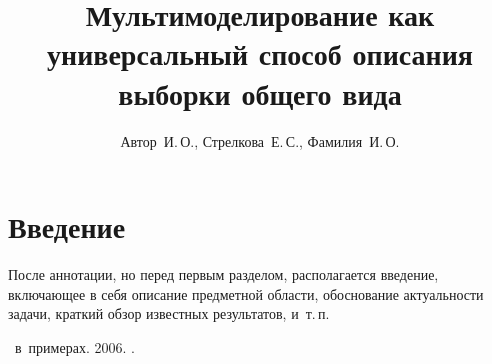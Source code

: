 \documentclass[12pt,twoside]{article}
\title
    [Мультимоделирование как универсальный способ описания выборки общего вида] %
    {Мультимоделирование как универсальный способ описания выборки общего вида}
\author
    [Автор~И.\,О.] %
    {Автор~И.\,О., Стрелкова~Е.\,С., Фамилия~И.\,О.} %
\begin{document}
\maketitle
\section{Введение}
После аннотации, но перед первым разделом,
располагается введение, включающее в себя
описание предметной области,
обоснование актуальности задачи,
краткий обзор известных результатов,
и~т.\,п.

\begin{thebibliography}{1}
    \LaTeXe\ в~примерах.
    2006.
    .
\end{thebibliography}
\end{document}
